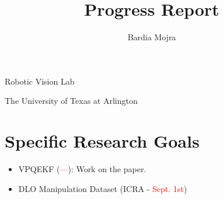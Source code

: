 \documentclass[11pt]{article}
\title{Progress Report}
\author{Bardia Mojra}
\begin{document}
\maketitle
\thispagestyle{empty}

\bigskip
\bigskip
\begin{center}
 Robotic Vision Lab
\end{center}

\begin{center}
The University of Texas at Arlington
\end{center}

\newpage

\section{Specific Research Goals}
\begin{itemize}
      \item VPQEKF (\textcolor{red}{---}): Work on the paper.
      \item DLO Manipulation Dataset (ICRA - \textcolor{red}{Sept. 1st})
\end{itemize}
\end{document}
